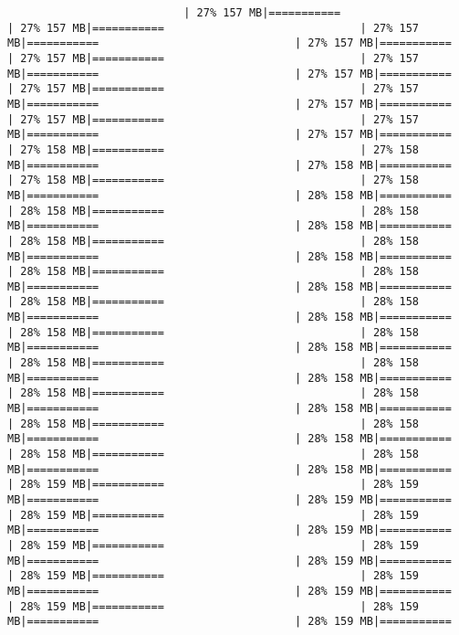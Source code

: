 \documentclass[
]{article}
\begin{document}
\begin{verbatim}
                           | 27% 157 MB|===========                              | 27% 157 MB|===========                              | 27% 157 MB|===========                              | 27% 157 MB|===========                              | 27% 157 MB|===========                              | 27% 157 MB|===========                              | 27% 157 MB|===========                              | 27% 157 MB|===========                              | 27% 157 MB|===========                              | 27% 157 MB|===========                              | 27% 157 MB|===========                              | 27% 157 MB|===========                              | 27% 157 MB|===========                              | 27% 158 MB|===========                              | 27% 158 MB|===========                              | 27% 158 MB|===========                              | 27% 158 MB|===========                              | 27% 158 MB|===========                              | 28% 158 MB|===========                              | 28% 158 MB|===========                              | 28% 158 MB|===========                              | 28% 158 MB|===========                              | 28% 158 MB|===========                              | 28% 158 MB|===========                              | 28% 158 MB|===========                              | 28% 158 MB|===========                              | 28% 158 MB|===========                              | 28% 158 MB|===========                              | 28% 158 MB|===========                              | 28% 158 MB|===========                              | 28% 158 MB|===========                              | 28% 158 MB|===========                              | 28% 158 MB|===========                              | 28% 158 MB|===========                              | 28% 158 MB|===========                              | 28% 158 MB|===========                              | 28% 158 MB|===========                              | 28% 158 MB|===========                              | 28% 158 MB|===========                              | 28% 158 MB|===========                              | 28% 158 MB|===========                              | 28% 158 MB|===========                              | 28% 158 MB|===========                              | 28% 158 MB|===========                              | 28% 158 MB|===========                              | 28% 158 MB|===========                              | 28% 159 MB|===========                              | 28% 159 MB|===========                              | 28% 159 MB|===========                              | 28% 159 MB|===========                              | 28% 159 MB|===========                              | 28% 159 MB|===========                              | 28% 159 MB|===========                              | 28% 159 MB|===========                              | 28% 159 MB|===========                              | 28% 159 MB|===========                              | 28% 159 MB|===========                              | 28% 159 MB|===========                              | 28% 159 MB|===========                              | 28% 159 MB|===========                              | 28% 159 MB|===========                            
\end{verbatim}
\end{document}
